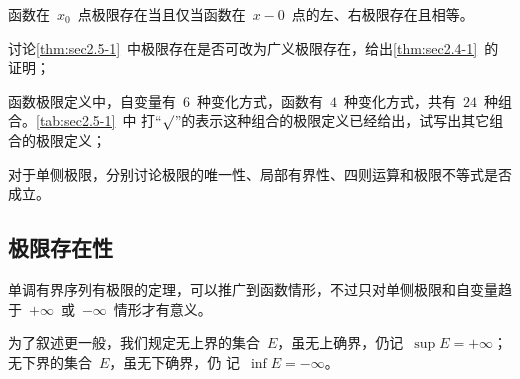 \begin{theorem}\label{thm:sec2.5-1}
函数在~$x_0$~点极限存在当且仅当函数在~$x-0$~点的左、右极限存在且相等。
\end{theorem}

\begin{quiz}
\begin{thmenumlist}
\item 讨论\ref{thm:sec2.5-1}~中极限存在是否可改为广义极限存在，给出\ref{thm:sec2.4-1}~的证明；
\item 函数极限定义中，自变量有~$6$~种变化方式，函数有~$4$~种变化方式，共有~$24$~种组合。\ref{tab:sec2.5-1}~中
打“$\surd$”的表示这种组合的极限定义已经给出，试写出其它组合的极限定义；
\begin{table}
\extrarowsep=1mm
\caption{}\label{tab:sec2.5-1}
\end{table}
\item 对于单侧极限，分别讨论极限的唯一性、局部有界性、四则运算和极限不等式是否成立。
\end{thmenumlist}
\end{quiz}

\subsection{极限存在性}

单调有界序列有极限的定理，可以推广到函数情形，不过只对单侧极限和自变量趋于~$+\infty$~或~$-\infty$~情形才有意义。

为了叙述更一般，我们规定无上界的集合~$E$，虽无上确界，仍记~$\sup E=+\infty$；无下界的集合~$E$，虽无下确界，仍
记~$\inf E=-\infty$。

